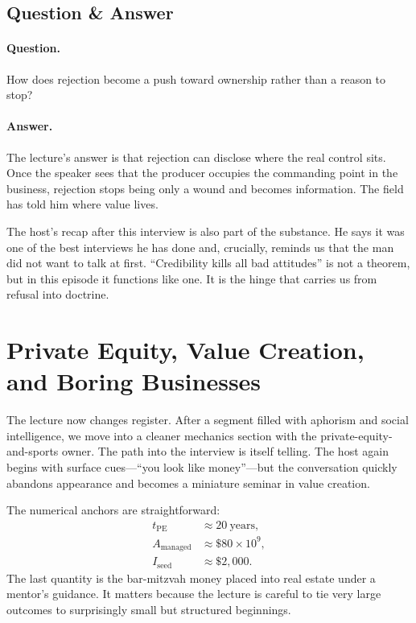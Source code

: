 \subsection{Question \& Answer}

\paragraph{Question.} How does rejection become a push toward ownership rather than a reason to stop?

\paragraph{Answer.} The lecture's answer is that rejection can disclose where the real control sits. Once the speaker sees that the producer occupies the commanding point in the business, rejection stops being only a wound and becomes information. The field has told him where value lives.

The host's recap after this interview is also part of the substance. He says it was one of the best interviews he has done and, crucially, reminds us that the man did not want to talk at first. ``Credibility kills all bad attitudes'' is not a theorem, but in this episode it functions like one. It is the hinge that carries us from refusal into doctrine.

\section{Private Equity, Value Creation, and Boring Businesses}

The lecture now changes register. After a segment filled with aphorism and social intelligence, we move into a cleaner mechanics section with the private-equity-and-sports owner. The path into the interview is itself telling. The host again begins with surface cues---``you look like money''---but the conversation quickly abandons appearance and becomes a miniature seminar in value creation.

The numerical anchors are straightforward:
\begin{align}
t_{\text{PE}} &\approx 20\ \text{years},\\
A_{\text{managed}} &\approx \$80 \times 10^9,\\
I_{\text{seed}} &\approx \$2{,}000.
\end{align}
The last quantity is the bar-mitzvah money placed into real estate under a mentor's guidance. It matters because the lecture is careful to tie very large outcomes to surprisingly small but structured beginnings.

